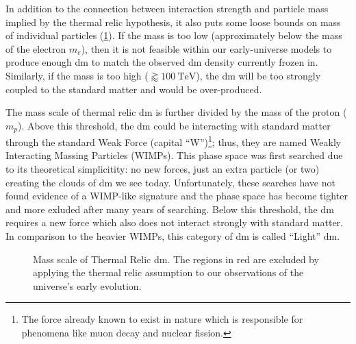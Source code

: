 In addition to the connection between interaction strength and particle mass implied by the thermal
relic hypothesis, it also puts some loose bounds on mass of individual particles (\cref{fig:dm-mass-scale}).
If the mass is too low (approximately below the mass of the electron $m_e$), then it is not feasible within our early-universe models to produce enough
\gls{dm} to match the observed \gls{dm} density currently frozen in. Similarly, if the mass is too
high ($\gtrapprox 100~\text{TeV}$), the \gls{dm} will be too strongly coupled to the standard matter and would be over-produced.

The mass scale of thermal relic \gls{dm} is further divided by the mass of the proton ($m_p$).
Above this threshold, the \gls{dm} could be interacting with standard matter through the standard
Weak Force (capital ``W'')\footnote{
    The force already known to exist in nature which is responsible for phenomena
    like muon decay and nuclear fission.
}; thus, they are named Weakly Interacting Massing Particles (WIMPs). This phase space was
first searched due to its theoretical simplicitity: no new forces, just an extra particle (or two)
creating the clouds of \gls{dm} we see today. Unfortunately, these searches have not found evidence
of a WIMP-like signature\cite{supercdms-2018,damic-2020,xenon1t-2018} and the phase space has become tighter
and more exluded after many years of searching. Below this threshold, the \gls{dm} requires a new
force which also does not interact strongly with standard matter. In comparison to the heavier WIMPs,
this category of \gls{dm} is called ``Light'' \gls{dm}.

\begin{figure}
    \centering
    
    \caption{Mass scale of Thermal Relic \gls{dm}.
        The regions in red are excluded by applying the thermal relic assumption
        to our observations of the universe's early evolution.}
    \label{fig:dm-mass-scale}
\end{figure}

